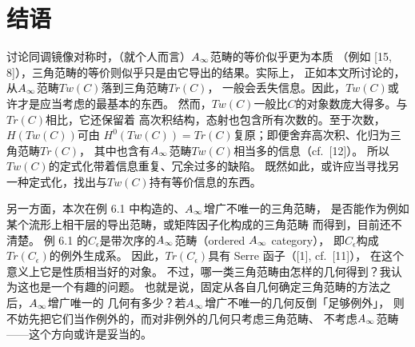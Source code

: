 
\section{结语}

讨论同调镜像对称时，（就个人而言）\(A_{\infty}\)范畴的等价似乎更为本质
（例如 [15, 8]），三角范畴的等价则似乎只是由它导出的结果。实际上，
正如本文所讨论的，从\(A_{\infty}\)范畴\(Tw(C)\)落到三角范畴\(Tr(C)\)，
一般会丢失信息。因此，\(Tw(C)\)或许才是应当考虑的最基本的东西。
然而，\(Tw(C)\)一般比\(C\)的对象数庞大得多。与\(Tr(C)\)相比，它还保留着
高次积结构，态射也包含所有次数的。至于次数，\(H(Tw(C))\)可由
\(H^{0}(Tw(C))=Tr(C)\)复原；即便舍弃高次积、化归为三角范畴\(Tr(C)\)，
其中也含有\(A_{\infty}\)范畴\(Tw(C)\)相当多的信息（cf.\ [12]）。
所以\(Tw(C)\)的定式化带着信息重复、冗余过多的缺陷。
既然如此，或许应当寻找另一种定式化，找出与\(Tw(C)\)持有等价信息的东西。


另一方面，本次在例 6.1 中构造的、\(A_{\infty}\)增广不唯一的三角范畴，
是否能作为例如某个流形上相干层的导出范畴，或矩阵因子化构成的三角范畴
而得到，目前还不清楚。
例 6.1 的\(C_{\epsilon}\)是带次序的\(A_{\infty}\)范畴（ordered \(A_{\infty}\) category），
即\(C_{\epsilon}\)构成\(Tr(C_{\epsilon})\)的例外生成系。
因此，\(Tr(C_{\epsilon})\)具有 Serre 函子（[1], cf.\ [11]），
在这个意义上它是性质相当好的对象。
不过，哪一类三角范畴由怎样的几何得到？我认为这也是一个有趣的问题。
也就是说，固定从各自几何确定三角范畴的方法之后，\(A_{\infty}\)增广唯一的
几何有多少？若\(A_{\infty}\)增广不唯一的几何反倒「足够例外」，
则不妨先把它们当作例外的，而对非例外的几何只考虑三角范畴、
不考虑\(A_{\infty}\)范畴——这个方向或许是妥当的。

